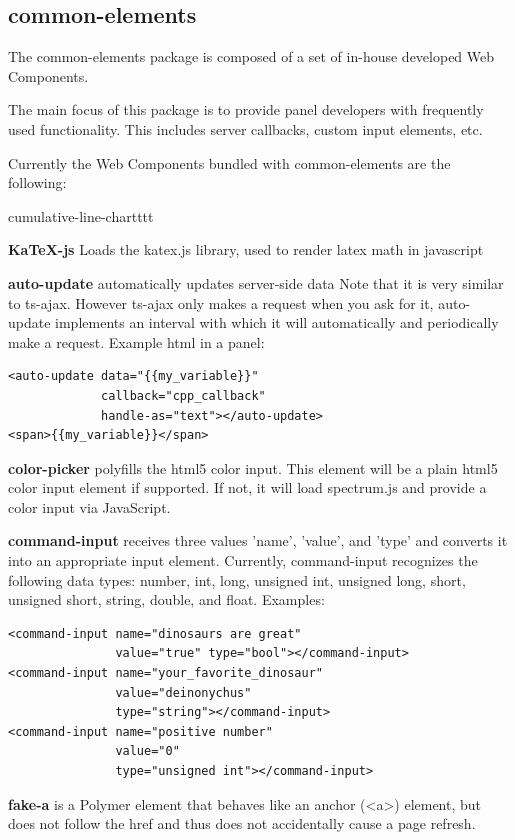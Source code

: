 \subsection{common-elements}
The common-elements package is composed of a set of in-house developed Web Components.

The main focus of this package is to provide panel developers with frequently
used functionality. This includes server callbacks, custom input elements, etc.

Currently the Web Components bundled with common-elements are the following:
\begin{labeling}{cumulative-line-chartttt}

\item [\textbf{KaTeX-js}] Loads the katex.js library, used to render latex math in javascript
\item [\textbf{auto-update}] automatically updates server-side data
Note that it is very similar to ts-ajax. However ts-ajax only makes a request when you ask for it, auto-update implements an interval with which it will automatically and periodically make a request.
Example html in a panel:
\begin{verbatim}
<auto-update data="{{my_variable}}"
             callback="cpp_callback"
             handle-as="text"></auto-update>
<span>{{my_variable}}</span>
\end{verbatim}
\item [\textbf{color-picker}] polyfills the html5 color input.
This element will be a plain html5 color input element if supported. If not, it
will load spectrum.js and provide a color input via JavaScript.
\item [\textbf{command-input}] receives three values 'name', 'value', and 'type' and converts it into an appropriate input element.
Currently, command-input recognizes the following data types: number, int, long, unsigned int, unsigned long, short, unsigned short, string, double, and float.
Examples:
\begin{verbatim}
<command-input name="dinosaurs are great"
               value="true" type="bool"></command-input>
<command-input name="your_favorite_dinosaur"
               value="deinonychus"
               type="string"></command-input>
<command-input name="positive number"
               value="0"
               type="unsigned int"></command-input>
\end{verbatim}
\item [\textbf{fake-a}] is a Polymer element that behaves like an anchor (<a>) element, but does not follow the href and thus does not accidentally cause a page refresh.

\end{labeling}
